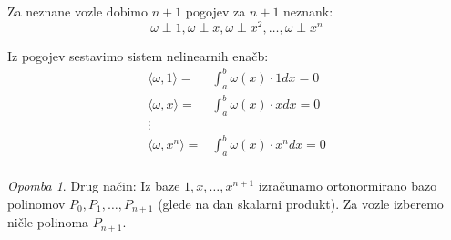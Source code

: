 \documentclass[a4paper,12pt]{article}
\newcommand{\innerproduct}[2]{\langle #1, #2 \rangle}
\theoremstyle{definition}
\theoremstyle{remark}
\newtheorem*{rem}{Opomba}
\begin{document}
Za neznane vozle dobimo $n + 1$ pogojev za $n + 1$ neznank:
\begin{equation*}
    \omega \perp 1, \omega \perp x, \omega \perp x^2, \dots, \omega \perp x^n
\end{equation*}

Iz pogojev sestavimo sistem nelinearnih enačb:
\begin{align*}
    \innerproduct{\omega}{1} =& \int_{a}^{b} \omega(x) \cdot 1 dx  = 0\\
    \innerproduct{\omega}{x} =& \int_{a}^{b} \omega(x) \cdot x dx  = 0\\
    \vdots\\
    \innerproduct{\omega}{x^n} =& \int_{a}^{b} \omega(x) \cdot x^n dx = 0\\
\end{align*}

\begin{rem}
    Drug način: Iz baze $1, x, \dots, x^{n+1}$ izračunamo ortonormirano bazo polinomov $P_0, P_1, \dots, P_{n+1}$ (glede na dan skalarni produkt).
    Za vozle izberemo ničle polinoma $P_{n+1}$.
\end{rem}
\end{document}
